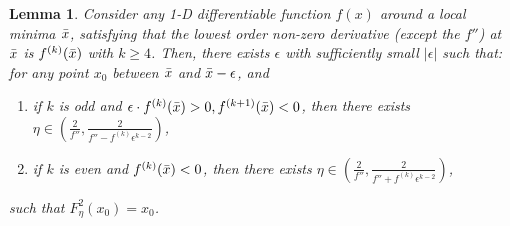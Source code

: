 \documentclass{article}
\theoremstyle{plain}
\newtheorem{lemma}{Lemma}
\theoremstyle{remark}
\newcommand{\red}[1]{{\color{black}#1}}
\newcommand{\T}[1]{^{(#1)}}
\def\O{\mathcal{O}}
\newcommand{\fix}[1]{\noindent{\color{blue}{#1}}}
\begin{document}
\begin{lemma}
    Consider any 1-D differentiable function $f(x)$ around a local minima $\Bar{x}$, satisfying that the lowest order non-zero derivative (except the $f''$) at $\Bar{x}$ is $f\T{k}(\Bar{x})$ with $k\ge 4$. Then, there exists $\epsilon$ with sufficiently small $|\epsilon|$ such that: for any point $x_0$ between $\Bar{x}$ and $\Bar{x}-\epsilon$, and
    \begin{enumerate}
        \item if $k$ is odd and $\epsilon\cdot f\T{k}(\Bar{x})>0, f\T{k+1}(\Bar{x})<0$, 
        then there exists $\eta\in(\frac{2}{f''}, \frac{2}{f''-f\T{k}\epsilon^{k-2}})$,
        \item if $k$ is even and $f\T{k}(\Bar{x})<0$, then there exists $\eta\in(\frac{2}{f''}, \frac{2}{f''+f\T{k}\epsilon^{k-2}})$,
    \end{enumerate}
    such that $F^2_\eta(x_0)=x_0$.
    \label{lem:1dhigher}
    \end{lemma}
\end{document}
